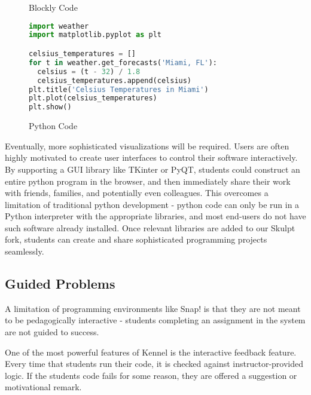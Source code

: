 \documentclass{sig-alternate}
\begin{document}
\begin{figure*}[ht]
\centering
\begin{minipage}[b]{0.45\linewidth}
\caption{Blockly Code}
\label{fig-example-blockly}
\end{minipage}
\quad
\begin{minipage}[b]{0.45\linewidth}
\begin{lstlisting}[language=Python, showstringspaces=false, columns=fullflexible]
import weather
import matplotlib.pyplot as plt

celsius_temperatures = []
for t in weather.get_forecasts('Miami, FL'):
  celsius = (t - 32) / 1.8
  celsius_temperatures.append(celsius)
plt.title('Celsius Temperatures in Miami')
plt.plot(celsius_temperatures)
plt.show()
\end{lstlisting}
\caption{Python Code}
\label{fig-example-python}
\end{minipage}
\end{figure*}


Eventually, more sophisticated visualizations will be required.
Users are often highly motivated to create user interfaces to control their software interactively.
By supporting a GUI library like TKinter or PyQT, students could construct an entire python program in the browser, and then immediately share their work with friends, families, and potentially even colleagues.
This overcomes a limitation of traditional python development - python code can only be run in a Python interpreter with the appropriate libraries, and most end-users do not have such software already installed.
Once relevant libraries are added to our Skulpt fork, students can create and share sophisticated programming projects seamlessly.
	
\subsection{Guided Problems}

A limitation of programming environments like Snap! is that they are not meant to be pedagogically interactive - students completing an assignment in the system are not guided to success.

One of the most powerful features of Kennel is the interactive feedback feature. Every time that students run their code, it is checked against instructor-provided logic. If the students code fails for some reason, they are offered a suggestion or motivational remark.
\end{document}
